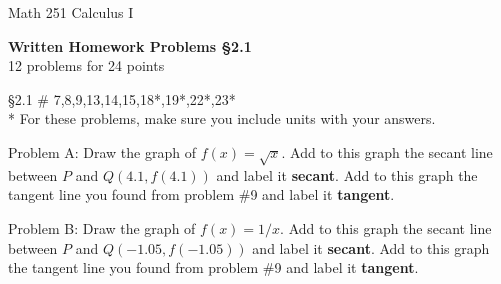 \documentclass[11pt]{report}
\theoremstyle{plain}
\begin{document}
\hfill Math 251 Calculus I
\begin{center}
\Large{\textbf{Written Homework Problems \S 2.1}} \\
12 problems for 24 points\\
\end{center}
\begin{description}
\item{\S 2.1} \# 7,8,9,13,14,15,18*,19*,22*,23* \\

* For these problems, make sure you include units with your answers.\\

\item Problem A: Draw the graph of $f(x)=\sqrt{x}.$ Add to this graph the secant line between $P$ and $Q(4.1, f(4.1))$ and label it \textbf{secant}. Add to this graph the tangent line you found from problem \#9 and label it \textbf{tangent}.

\item Problem B: Draw the graph of $f(x)=1/x.$ Add to this graph the secant line between $P$ and $Q(-1.05, f(-1.05))$ and label it \textbf{secant}. Add to this graph the tangent line you found from problem \#9 and label it \textbf{tangent}.

\end{description}
\end{document}
